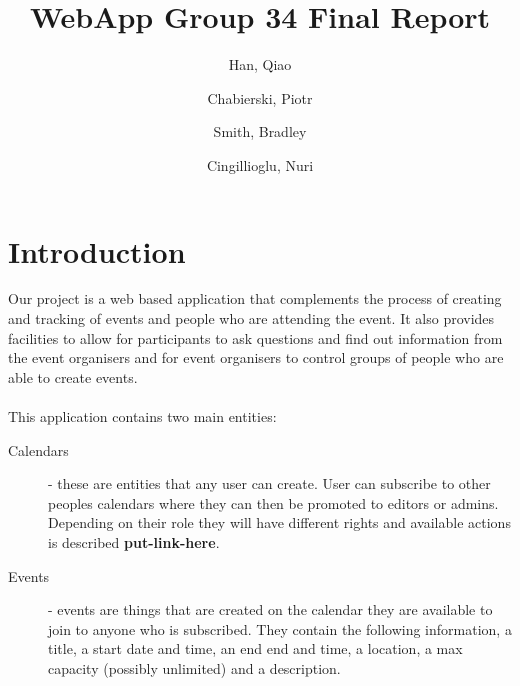 \documentclass[10pt,a4paper]{article}
\begin{document}
\title{WebApp Group 34 Final Report}
\author{
  Han, Qiao\\
  \and
  Chabierski, Piotr\\
  \and
  Smith, Bradley\\
  \and
  Cingillioglu, Nuri\\
}

\maketitle

\section{Introduction}
Our project is a web based application that complements the process of creating and tracking of events and people who are attending the event. It also provides facilities to allow for participants to ask questions and find out information from the event organisers and for event organisers to control groups of people who are able to create events. 
\\
\\
\noindent This application contains two main entities:
\begin{description}
\item[Calendars] - these are entities that any user can create. User can subscribe to other peoples calendars where they can then be promoted to editors or admins. Depending on their role they will have different rights and available actions is described \textbf{put-link-here}.
\item[Events] - events are things that are created on the calendar they are available to join to anyone who is subscribed. They contain the following information, a title, a start date and time, an end end and time, a location, a max capacity (possibly unlimited) and a description.
\end{description}
\end{document}
